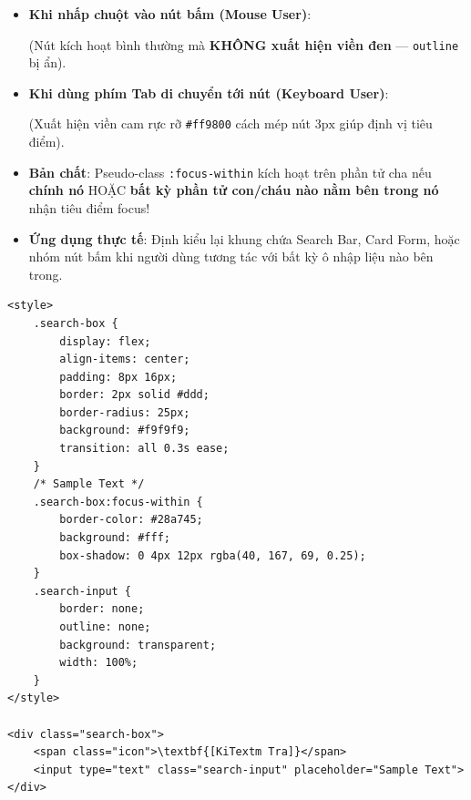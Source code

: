 \documentclass[11pt,oneside]{book}
\newcommand{\codeinline}[1]{\textcolor{accentOrange}{\texttt{#1}}}
\begin{document}
\begin{browserWindow}
\sffamily\small
\begin{itemize}[leftmargin=1.5em, itemsep=3pt, parsep=0pt]
    \item \textbf{Khi nhấp chuột vào nút bấm (Mouse User)}:
    \par\vspace{2pt}
    \quad (Nút kích hoạt bình thường mà \textbf{KHÔNG xuất hiện viền đen} — \codeinline{outline} bị ẩn).
    \par\vspace{4pt}
    \item \textbf{Khi dùng phím Tab di chuyển tới nút (Keyboard User)}:
    \par\vspace{2pt}
    \quad (Xuất hiện viền cam rực rỡ \codeinline{\#ff9800} cách mép nút $3\text{px}$ giúp định vị tiêu điểm).
\end{itemize}
\end{browserWindow}

\begin{conceptBox}
\begin{itemize}[leftmargin=1.5em, itemsep=3pt, parsep=0pt]
    \item \textbf{Bản chất}: Pseudo-class \codeinline{:focus-within} kích hoạt trên phần tử cha nếu \textbf{chính nó} HOẶC \textbf{bất kỳ phần tử con/cháu nào nằm bên trong nó} nhận tiêu điểm focus!
    \item \textbf{Ứng dụng thực tế}: Định kiểu lại khung chứa Search Bar, Card Form, hoặc nhóm nút bấm khi người dùng tương tác với bất kỳ ô nhập liệu nào bên trong.
\end{itemize}

\begin{codeWindow}
\begin{lstlisting}[language=HTML5]
<style>
    .search-box {
        display: flex;
        align-items: center;
        padding: 8px 16px;
        border: 2px solid #ddd;
        border-radius: 25px;
        background: #f9f9f9;
        transition: all 0.3s ease;
    }
    /* Sample Text */
    .search-box:focus-within {
        border-color: #28a745;
        background: #fff;
        box-shadow: 0 4px 12px rgba(40, 167, 69, 0.25);
    }
    .search-input {
        border: none;
        outline: none;
        background: transparent;
        width: 100%;
    }
</style>

<div class="search-box">
    <span class="icon">\textbf{[KiTextm Tra]}</span>
    <input type="text" class="search-input" placeholder="Sample Text">
</div>
\end{lstlisting}
\end{codeWindow}
\end{conceptBox}
\end{document}
